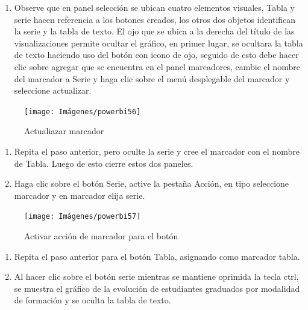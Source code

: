 \documentclass[
]{book}
\providecommand{\tightlist}{%
  \setlength{\itemsep}{0pt}\setlength{\parskip}{0pt}}
\begin{document}
\begin{enumerate}
\def\labelenumi{\arabic{enumi}.}
\setcounter{enumi}{8}
\tightlist
\item
  Observe que en panel selección se ubican cuatro elementos visuales, Tabla y serie hacen referencia a los botones creados, los otros dos objetos identifican la serie y la tabla de texto. El ojo que se ubica a la derecha del título de las visualizaciones permite ocultar el gráfico, en primer lugar, se ocultara la tabla de texto haciendo uso del botón con icono de ojo, seguido de esto debe hacer clic sobre agregar que se encuentra en el panel marcadores, cambie el nombre del marcador a Serie y haga clic sobre el menú desplegable del marcador y seleccione actualizar.
\end{enumerate}

\begin{figure}

{\centering \texttt{[image: Imágenes/powerbi56]} 

}

\caption{Actualiazar marcador}\label{fig:paso9alternancia-fig}
\end{figure}

\begin{enumerate}
\def\labelenumi{\arabic{enumi}.}
\setcounter{enumi}{9}
\item
  Repita el paso anterior, pero oculte la serie y cree el marcador con el nombre de Tabla. Luego de esto cierre estos dos paneles.
\item
  Haga clic sobre el botón Serie, active la pestaña Acción, en tipo seleccione marcador y en marcador elija serie.
\end{enumerate}

\begin{figure}

{\centering \texttt{[image: Imágenes/powerbi57]} 

}

\caption{Activar acción de marcador para el botón}\label{fig:paso11alternancia-fig}
\end{figure}

\begin{enumerate}
\def\labelenumi{\arabic{enumi}.}
\setcounter{enumi}{11}
\item
  Repita el paso anterior para el botón Tabla, asignando como marcador tabla.
\item
  Al hacer clic sobre el botón serie mientras se mantiene oprimida la tecla ctrl, se muestra el gráfico de la evolución de estudiantes graduados por modalidad de formación y se oculta la tabla de texto.
\end{enumerate}
\end{document}
